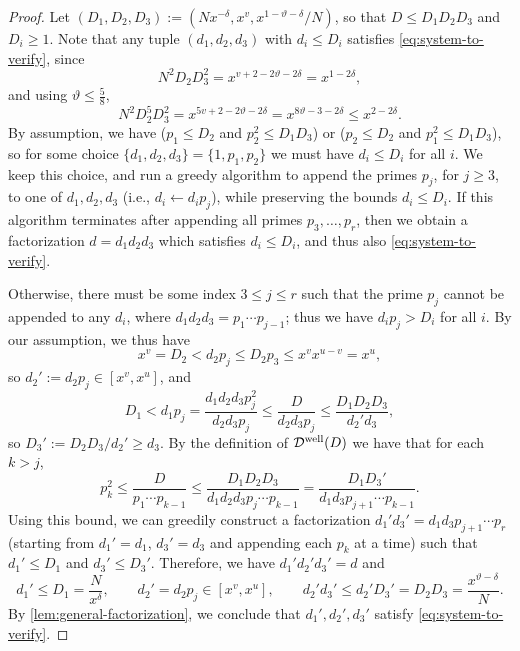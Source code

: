 \documentclass[reqno,11pt]{amsart}
\theoremstyle{remark}
\numberwithin{equation}{section}
\newcommand{\mDw}{\mathcal{D}^{\textnormal{well}}}
\begin{document}
\begin{proof}
Let $(D_1, D_2, D_3) := (Nx^{-\delta}, x^v, x^{1-\vartheta-\delta}/N)$, so that $D \le D_1 D_2 D_3$ and $D_i \ge 1$. Note that any tuple $(d_1, d_2, d_3)$ with $d_i \le D_i$ satisfies \cref{eq:system-to-verify}, since
\[
    N^2 D_2 D_3^2 = x^{v + 2-2\vartheta-2\delta} = x^{1-2\delta},
\]
and using $\vartheta \le \tfrac{5}{8}$,
\[
    N^2 D_2^5 D_3^2 = x^{5v + 2-2\vartheta-2\delta} = x^{8\vartheta-3-2\delta} \le x^{2-2\delta}.
\]
By assumption, we have ($p_1 \le D_2$ and $p_2^2 \le D_1D_3$) or ($p_2 \le D_2$ and $p_1^2 \le D_1D_3$), so for some choice $\{d_1, d_2, d_3\} = \{1, p_1, p_2\}$ we must have $d_i \le D_i$ for all $i$. We keep this choice, and run a greedy algorithm to append the primes $p_j$, for $j \ge 3$, to one of $d_1, d_2, d_3$ (i.e., $d_i \gets d_ip_j$), while preserving the bounds $d_i \le D_i$. If this algorithm terminates after appending all primes $p_3, \ldots, p_r$, then we obtain a factorization $d = d_1d_2d_3$ which satisfies $d_i \le D_i$, and thus also \cref{eq:system-to-verify}.

Otherwise, there must be some index $3 \le j \le r$ such that the prime $p_j$ cannot be appended to any $d_i$, where $d_1d_2d_3 = p_1\cdots p_{j-1}$; thus we have $d_ip_j > D_i$ for all $i$. By our assumption, we thus have
\[
    x^v = D_2 < d_2p_j \le D_2p_3 \le x^v x^{u-v} = x^u,
\]
so $d_2' := d_2p_j \in [x^v, x^u]$, and
\[
    D_1 < d_1 p_j = \frac{d_1d_2d_3p_j^2}{d_2d_3p_j} \le \frac{D}{d_2d_3p_j} \le \frac{D_1 D_2 D_3}{d_2'd_3},
\]
so $D_3' := D_2 D_3/d_2' \ge d_3$. By the definition of $\mDw(D)$ we have that for each $k > j$,
\[
    p_k^2 \le \frac{D}{p_1\cdots p_{k-1}} \le \frac{D_1D_2D_3}{d_1d_2d_3 p_j \cdots p_{k-1}} 
    =
    \frac{D_1D_3'}{d_1d_3p_{j+1} \cdots p_{k-1}}.
\]
Using this bound, we can greedily construct a factorization $d_1' d_3' = d_1d_3 p_{j+1} \cdots p_r$ (starting from $d_1' = d_1$, $d_3' = d_3$ and appending each $p_k$ at a time) such that $d_1' \le D_1$ and $d_3' \le D_3'$. Therefore, we have $d_1'd_2'd_3' = d$ and
\[
    d_1' \le D_1 = \frac{N}{x^{\delta}}, 
    \qquad 
    d_2' = d_2p_j \in [x^v, x^u],
    \qquad 
    d_2'd_3' \le d_2'D_3' = D_2D_3 = \frac{x^{\vartheta-\delta}}{N}.
\]
By \cref{lem:general-factorization}, we conclude that $d_1', d_2', d_3'$ satisfy \cref{eq:system-to-verify}.
\end{proof}
\end{document}
